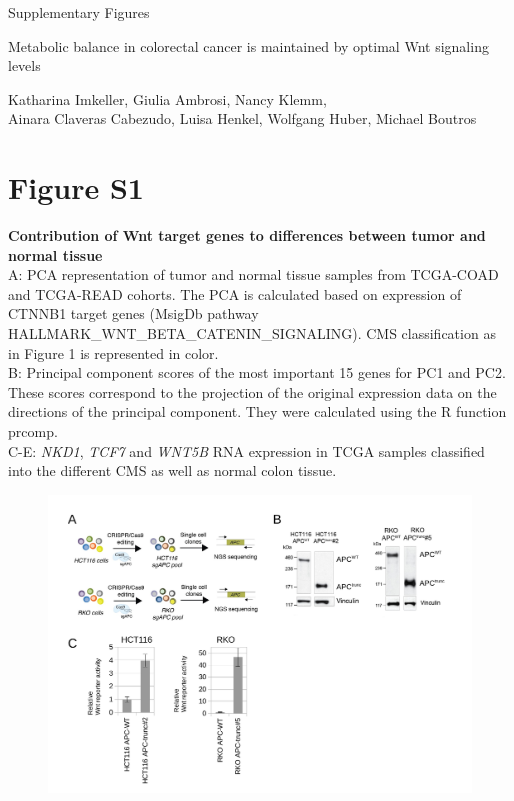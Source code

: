\documentclass[11pt,a4paper,titlepage]{article}
\begin{document}
\begin{center}


\Huge{Supplementary Figures}

\vspace{2cm}
\huge{Metabolic balance in colorectal cancer is maintained by 
optimal Wnt signaling levels}

\vspace{2cm}
\large{Katharina Imkeller, Giulia Ambrosi, Nancy Klemm,\\Ainara Claveras Cabezudo, 
Luisa Henkel, Wolfgang Huber, Michael Boutros}
\end{center}

\titlepage

\pagebreak

\section*{Figure S1}

\textbf{Contribution of Wnt target genes to differences between tumor and normal tissue}\\
A: PCA representation of tumor and normal tissue samples from TCGA-COAD and TCGA-READ cohorts. The PCA is calculated based on expression of CTNNB1 target genes (MsigDb pathway HALLMARK\_WNT\_BETA\_CATENIN\_SIGNALING). CMS classification as in Figure 1 is represented in color.\\
B: Principal component scores of the most important 15 genes for PC1 and PC2. These scores correspond to the projection of the original expression data on the directions of the principal component. They were calculated using the R function prcomp.\\
C-E: \textit{NKD1}, \textit{TCF7} and \textit{WNT5B} RNA expression in TCGA samples classified into the different CMS as well as normal colon tissue.

\begin{figure}[h]
\includegraphics[scale=0.6]{FigureS1.pdf} 

\end{figure}
\end{document}
